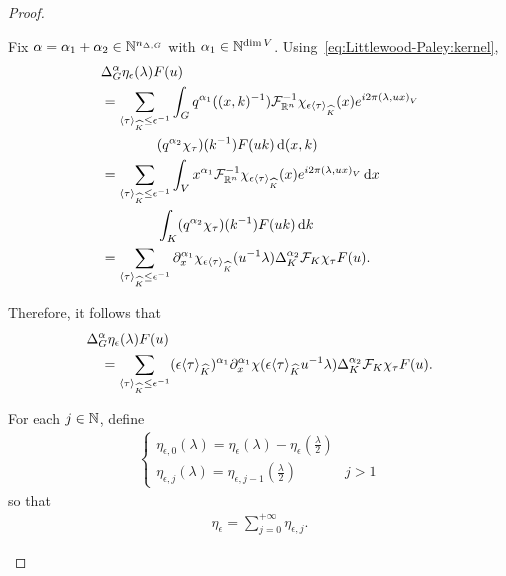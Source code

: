 \begin{proof}
\begin{description}
            Fix $\alpha = \alpha_1 + \alpha_2 \in \mathbb{N}^{{n_{\Delta, G}}}$ with $\alpha_1 \in \mathbb{N}^{\dim V}$.
            Using~\eqref{eq:Littlewood-Paley:kernel},
            \begin{align*}
                &\DifferenceOperatorOrder \alpha \eta_\epsilon(\lambda) F(u)\\
                &= \sum_{\JapaneseBracket \CompactGroup \tau \leq \epsilon^{-1}} \int_\Group
                q^{\alpha_1}((x, k)^{-1}) \InverseFourier [\R^n] \chi_{\epsilon \JapaneseBracket \CompactGroup \tau}(x) \e^{\i \turn \ip \lambda {u x}}\\
                & \qquad \qquad (q^{\alpha_2} \chi_\tau)(k^{-1}) F(u k) \dd (x, k)\\
                &= \sum_{\JapaneseBracket \CompactGroup \tau \leq \epsilon^{-1}}
                \int_\VectorSpace x^{\alpha_1} \InverseFourier [\R^n] \chi_{\epsilon \JapaneseBracket \CompactGroup \tau}(x) \e^{\i \turn \ip \lambda {u x}} \dd x\\
                & \qquad \qquad \int_\CompactGroup (q^{\alpha_2} \chi_\tau)(k^{-1}) F(u k) \dd k\\
                &= \sum_{\JapaneseBracket \CompactGroup \tau \leq \epsilon^{-1}}
                \iD {x^{\alpha_1} } \chi_{\epsilon \JapaneseBracket \CompactGroup \tau}(u^{-1} \lambda)
                \DifferenceOperatorOrder [\CompactGroup] {\alpha_2} \Fourier [\CompactGroup] \chi_\tau F(u).
            \end{align*}

            Therefore, it follows that
            \begin{align}
                &\DifferenceOperatorOrder \alpha \eta_\epsilon(\lambda) F(u)\notag\\
                &\quad= \sum_{\JapaneseBracket \CompactGroup \tau \leq \epsilon^{-1}}
                (\epsilon \JapaneseBracket \CompactGroup \tau)^{\alpha_1} \iD {x^{\alpha_1} } \chi(\epsilon \JapaneseBracket \CompactGroup \tau u^{-1} \lambda)
                \DifferenceOperatorOrder [\CompactGroup] {\alpha_2} \Fourier [\CompactGroup] \chi_\tau F(u).
                \label{eq:Littlewood-Paley:difference_operators}
            \end{align}

            For each $j \in \mathbb{N}$,
            define
            \begin{align*}
                \begin{cases}
                    \eta_{\epsilon, 0}(\lambda) = \eta_{\epsilon}(\lambda) - \eta_{\epsilon}(\frac \lambda 2)\\
                    \eta_{\epsilon, j}(\lambda) = \eta_{\epsilon, j - 1}(\frac \lambda 2) & j > 1
                \end{cases}
            \end{align*}
            so that
            \begin{align*}
                \eta_\epsilon = \sum_{j = 0}^{+\infty} \eta_{\epsilon, j}.
            \end{align*}


\end{description}
\end{proof}
